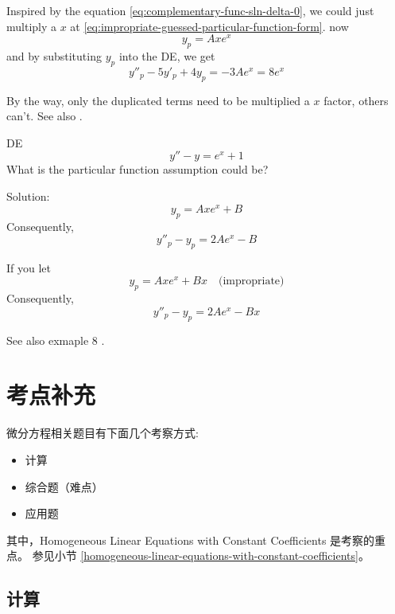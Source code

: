 Inspired by the equation \ref{eq:complementary-func-sln-delta-0}, 
we could just multiply a $x$ at \ref{eq:impropriate-guessed-particular-function-form}.
now
\[
    y_p = Ax e^x
\]
and by substituting $y_p$ into the DE, we get
\[
    y''_p - 5 y'_p + 4y_p = -3A e^x = 8e^x
\]

By the way, only the duplicated terms need to be multiplied a $x$ factor,
others can't. See also \cite[page 145, pdf 156, example 3]{we}.
\begin{example}
    DE
    \[
        y'' - y = e^x + 1
    \]
    What is the particular function assumption could be? 

    Solution:
    \[
        y_p = Axe^x + B
    \]
    Consequently,
    \[
        y''_p - y_p = 2Ae^x - B
    \]

    If you let
    \[
        y_p = Axe^x + Bx\quad \mbox{(impropriate)}
    \]
    Consequently,
    \[
        y''_p - y_p = 2Ae^x - Bx
    \]
\end{example}

See also exmaple 8 \cite[page 148]{fcde}.

\section{考点补充}

微分方程相关题目有下面几个考察方式:
\begin{itemize}
    \item 计算 
    \item 综合题（难点）
    \item 应用题
\end{itemize}

其中，Homogeneous Linear Equations with Constant Coefficients 是考察的重点。
参见小节 \ref{homogeneous-linear-equations-with-constant-coefficients}。

\subsection{计算}

